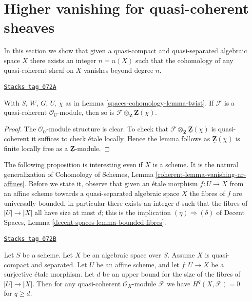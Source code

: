 \section{Higher vanishing for quasi-coherent sheaves}
\label{spaces-cohomology-section-higher-vanishing}
In this section we show that given a quasi-compact and
quasi-separated algebraic space $X$ there exists an integer
$n = n(X)$ such that the cohomology of any quasi-coherent
sheaf on $X$ vanishes beyond degree $n$.

\begin{lemma}
\label{spaces-cohomology-lemma-quasi-coherent-twist}
\href{https://stacks.math.columbia.edu/tag/072A}{\texttt{Stacks tag 072A}}

With $S$, $W$, $G$, $U$, $\chi$ as in
Lemma \ref{spaces-cohomology-lemma-twist}.
If $\mathcal{F}$ is a quasi-coherent $\mathcal{O}_U$-module,
then so is $\mathcal{F} \otimes_{\mathbf{Z}} \underline{\mathbf{Z}}(\chi)$.
\end{lemma}

\begin{proof}
The $\mathcal{O}_U$-module structure is clear. To check that
$\mathcal{F} \otimes_{\mathbf{Z}} \underline{\mathbf{Z}}(\chi)$
is quasi-coherent it suffices to check \'etale locally.
Hence the lemma follows as $\underline{\mathbf{Z}}(\chi)$
is finite locally free as a $\underline{\mathbf{Z}}$-module.
\end{proof}

The following proposition is interesting even if $X$ is a scheme.
It is the natural generalization of
Cohomology of Schemes, Lemma \ref{coherent-lemma-vanishing-nr-affines}.
Before we state it, observe that given an \'etale morphism
$f : U \to X$ from an affine scheme towards a quasi-separated algebraic
space $X$ the fibres of $f$ are universally bounded, in particular
there exists an integer $d$ such that the fibres of $|U| \to |X|$
all have size at most $d$; this is the implication
$(\eta) \Rightarrow (\delta)$ of
Decent Spaces, Lemma \ref{decent-spaces-lemma-bounded-fibres}.

\begin{proposition}[Vanishing]
\label{spaces-cohomology-proposition-vanishing}
\href{https://stacks.math.columbia.edu/tag/072B}{\texttt{Stacks tag 072B}}

Let $S$ be a scheme. Let $X$ be an algebraic space over $S$.
Assume $X$ is quasi-compact and separated.
Let $U$ be an affine scheme, and let
$f : U \to X$ be a surjective \'etale morphism.
Let $d$ be an upper bound for the size of the fibres of
$|U| \to |X|$. Then for any quasi-coherent $\mathcal{O}_X$-module $\mathcal{F}$
we have $H^q(X, \mathcal{F}) = 0$ for $q \geq d$.
\end{proposition}

